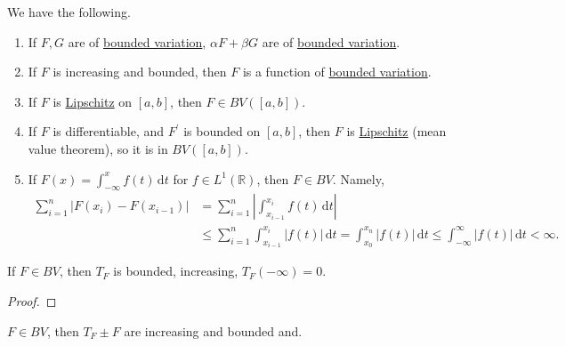 \begin{remark}
	We have the following.
	\begin{enumerate}
		\item If \(F,G\) are of \hyperref[def:bounded-variation]{bounded variation}, \(\alpha F + \beta G\) are of \hyperref[def:bounded-variation]{bounded variation}.
		\item If \(F\) is increasing and bounded, then \(F\) is a function of \hyperref[def:bounded-variation]{bounded variation}.
		\item If \(F\) is \hyperref[def:Lipschitz]{Lipschitz} on \([a,b]\), then \(F \in BV([a,b])\).
		\item If \(F\) is differentiable, and $F^\prime$ is bounded on \([a,b]\), then \(F\) is \hyperref[def:Lipschitz]{Lipschitz} (mean value theorem), so it is in \(BV([a,b])\).
		\item If \(F(x) = \int_{-\infty}^x f(t) \,\mathrm{d} t\) for \(f \in L^1(\mathbb{R})\), then \(F \in BV\).
		      Namely,
		      \[
			      \begin{split}
				      \sum_{i=1}^n \left\vert F(x_i) - F(x_{i-1}) \right\vert &= \sum_{i=1}^n \left\vert \int_{x_{i-1}}^{x_i} f(t) \,\mathrm{d} t \right\vert\\
				      &\leq \sum_{i=1}^n \int_{x_{i-1}}^{x_i} \left\vert f(t) \right\vert \,\mathrm{d} t
				      = \int_{x_0}^{x_n} \left\vert f(t) \right\vert \,\mathrm{d} t
				      \leq \int_{-\infty}^\infty \left\vert f(t) \right\vert \,\mathrm{d} t < \infty.
			      \end{split}
		      \]
	\end{enumerate}
\end{remark}

\begin{lemma}\label{lma:lec34-1}
	If \(F \in BV\), then \(T_F\) is bounded, increasing, \(T_F(-\infty) = 0\).
\end{lemma}
\begin{proof}
\end{proof}

\begin{lemma}\label{lma:lec34-2}
	\(F \in BV\), then \(T_F \pm F\) are increasing and bounded and.
\end{lemma}

